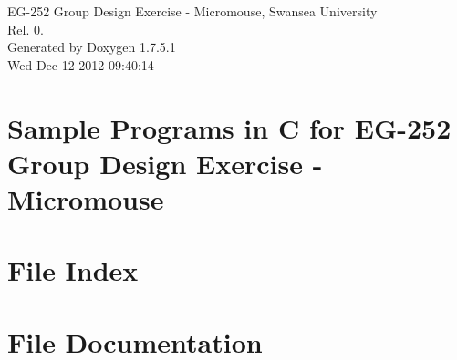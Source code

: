 \documentclass[a4paper]{book}
\begin{document}
\hypersetup{pageanchor=false,citecolor=blue}
\begin{titlepage}
\vspace*{7cm}
\begin{center}
{\Large \-E\-G-\/252 \-Group \-Design \-Exercise -\/ \-Micromouse, \-Swansea \-University \\[1ex]\large \-Rel. 0. }\\
\vspace*{1cm}
{\large \-Generated by Doxygen 1.7.5.1}\\
\vspace*{0.5cm}
{\small Wed Dec 12 2012 09:40:14}\\
\end{center}
\end{titlepage}
\clearemptydoublepage
{}
\tableofcontents
\clearemptydoublepage
{}
\hypersetup{pageanchor=true,citecolor=blue}
\chapter{\-Sample \-Programs in \-C for \-E\-G-\/252 \-Group \-Design \-Exercise -\/ \-Micromouse}
\label{index}\hypertarget{index}{}
\chapter{\-File \-Index}

\chapter{\-File \-Documentation}








\printindex
\end{document}

